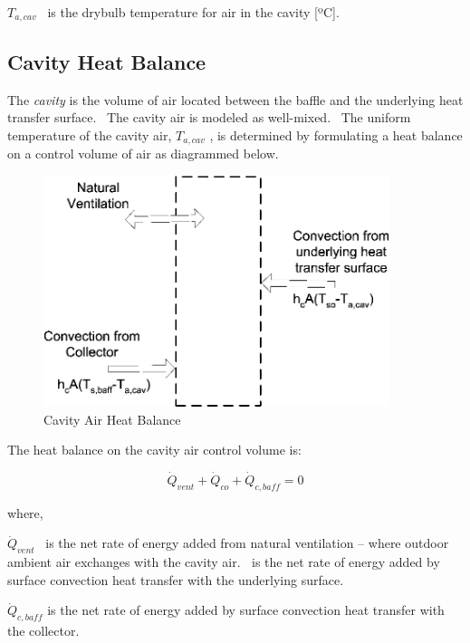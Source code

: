 \({T_{a,cav}}\) ~is the drybulb temperature for air in the cavity {[}ºC{]}.

\subsection{Cavity Heat Balance}\label{cavity-heat-balance}

The \emph{cavity} is the volume of air located between the baffle and the underlying heat transfer surface.~ The cavity air is modeled as well-mixed.~ The uniform temperature of the cavity air, \({T_{a,cav}}\) , is determined by formulating a heat balance on a control volume of air as diagrammed below.

\begin{figure}[hbtp] %
\centering
\includegraphics[width=0.9\textwidth, height=0.9\textheight, keepaspectratio=true]{media/image469.png}
\caption{  Cavity Air Heat Balance \protect \label{fig:cavity-air-heat-balance}}
\end{figure}

The heat balance on the cavity air control volume is:

\begin{equation}
{\dot Q_{vent}} + {\dot Q_{co}} + {\dot Q_{c,baff}} = 0
\end{equation}

where,

\({\dot Q_{vent}}\) ~is the net rate of energy added from natural ventilation -- where outdoor ambient air exchanges with the cavity air. \(_{ }\)~is the net rate of energy added by surface convection heat transfer with the underlying surface.

\({\dot Q_{c,baff}}\) is the net rate of energy added by surface convection heat transfer with the collector.

